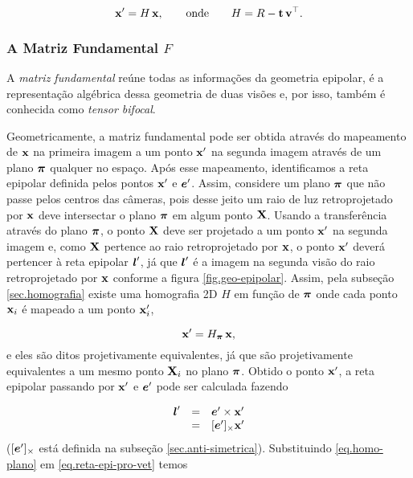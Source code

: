\begin{equation*}
\mathbf{x}'=H\,\mathbf{x},\qquad\text{onde}\qquad H=R-{\bf t}\,{\bf v}^\top.
\end{equation*}


\subsubsection{A Matriz Fundamental $F$}\label{sec.matriz-F}

A \textit{matriz fundamental} reúne todas as informações da geometria epipolar, é a representação algébrica dessa geometria de duas visões e, por isso, também é conhecida como \textit{tensor bifocal}. 

Geometricamente, a matriz fundamental pode ser obtida através do mapeamento de $\mathbf{x}$ na primeira imagem a um ponto $\mathbf{x}'$ na segunda imagem através de um plano $\boldsymbol{\pi}$ qualquer no espaço. Após esse mapeamento, identificamos a reta epipolar definida pelos pontos $\mathbf{x}'$ e $\boldsymbol{e}'$. Assim, considere um plano $\boldsymbol{\pi}$ que não passe pelos centros das câmeras, pois desse jeito um raio de luz retroprojetado por $\mathbf{x}$ deve intersectar o plano $\boldsymbol{\pi}$ em algum ponto $\mathbf{X}$. Usando a transferência através do plano $\boldsymbol{\pi}$, o ponto $\mathbf{X}$ deve ser projetado a um ponto $\mathbf{x}'$ na segunda imagem e, como $\mathbf{X}$ pertence ao raio retroprojetado por $\mathbf{x}$, o ponto $\mathbf{x}'$ deverá pertencer à reta epipolar $\boldsymbol{l}'$, já que $\boldsymbol{l}'$ é a imagem na segunda visão do raio retroprojetado por $\mathbf{x}$ conforme a figura \ref{fig.geo-epipolar}. Assim, pela subseção \ref{sec.homografia} existe uma homografia 2D $H$ em função de $\boldsymbol{\pi}$ onde cada ponto $\mathbf{x}_i$ é mapeado a um ponto $\mathbf{x}_i'$, 

\begin{equation}\label{eq.homo-plano}
\mathbf{x}'= H_{\boldsymbol{\pi}} \,\mathbf{x},
\end{equation}
e eles são ditos projetivamente equivalentes, já que são projetivamente equivalentes a um mesmo ponto $\mathbf{X}_i$ no plano $\boldsymbol{\pi}$. Obtido o ponto $\mathbf{x}'$, a reta epipolar passando por $\mathbf{x}'$ e $\boldsymbol{e}'$ pode ser calculada fazendo 

\begin{equation}\label{eq.reta-epi-pro-vet}
\begin{array}{rcl}
\boldsymbol{l}'&=&\boldsymbol{e}'\times\mathbf{x}'\\
&=&[\boldsymbol{e}']_\times\mathbf{x}'
\end{array}
\end{equation}
($[\boldsymbol{e}']_\times$ está definida na subseção \ref{sec.anti-simetrica}). Substituindo \ref{eq.homo-plano} em \ref{eq.reta-epi-pro-vet} temos


